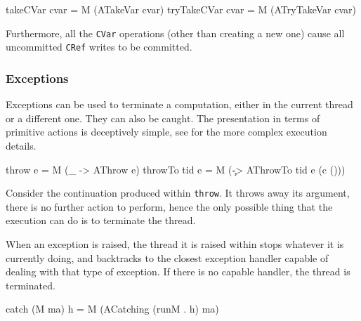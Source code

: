 
\begin{haskellcode}
takeCVar    cvar = M (ATakeVar    cvar)
tryTakeCVar cvar = M (ATryTakeVar cvar)
\end{haskellcode}



Furthermore, all the \verb|CVar| operations (other than creating a new
one) cause all uncommitted \verb|CRef| writes to be committed.

\subsubsection{Exceptions}
\label{sec:execution-primops-exceptions}

Exceptions can be used to terminate a computation, either in the
current thread or a different one. They can also be caught. The
presentation in terms of primitive actions is deceptively simple, see
 for the more complex execution details.

\begin{haskellcode}
throw       e = M (\_ -> AThrow e)
throwTo tid e = M (\c -> AThrowTo tid e (c ()))
\end{haskellcode}


Consider the continuation produced within \verb|throw|. It throws away
its argument, there is no further action to perform, hence the only
possible thing that the execution can do is to terminate the thread.


When an exception is raised, the thread it is raised within stops
whatever it is currently doing, and backtracks to the closest
exception handler capable of dealing with that type of exception. If
there is no capable handler, the thread is terminated.

\begin{haskellcode}
catch (M ma) h = M (ACatching (runM . h) ma)
\end{haskellcode}

